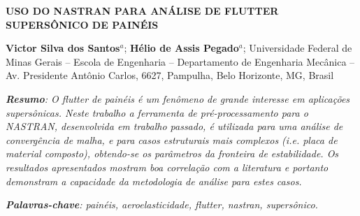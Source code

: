 \documentclass[11pt,a4paper]{article}
\begin{document}
\thispagestyle{plain}
\pagestyle{fancy}
\setlength{\headheight}{31pt}
\lhead{}


\begin{center}
\vspace{-4mm}
\Large{\textbf{USO DO NASTRAN PARA ANÁLISE DE FLUTTER SUPERSÔNICO DE PAINÉIS}}
 \end{center}
 
\hrulefill

\begin{adjustwidth}{0.5cm}{0cm}

\textbf{Victor Silva dos Santos}$^{a}$; \textbf{Hélio de Assis Pegado}$^{a}$;
\newline
[a] Universidade Federal de Minas Gerais -- Escola de Engenharia --
Departamento de Engenharia Mecânica -- Av. Presidente Antônio Carlos, 6627, Pampulha, Belo Horizonte, MG, Brasil

\hspace{0.2cm}

\noindent \textit{\textbf{Resumo}: 
O flutter de painéis é um fenômeno de grande interesse em aplicações supersônicas.
Neste trabalho a ferramenta de pré-processamento para o NASTRAN,
desenvolvida em trabalho passado, é 
utilizada para uma análise de convergência de malha, e para casos
estruturais mais complexos (i.e. placa de material composto), obtendo-se os parâmetros da fronteira de estabilidade. Os resultados apresentados mostram boa correlação com a literatura e portanto demonstram a capacidade da metodologia de análise para estes casos.
}
\end{adjustwidth}

\vspace{0.5cm}

\begin{adjustwidth}{0.4cm}{0cm}

\textit{\textbf{Palavras-chave}: painéis, aeroelasticidade, flutter, nastran, supersônico.}

\end{adjustwidth}

\hrulefill






\end{document}
